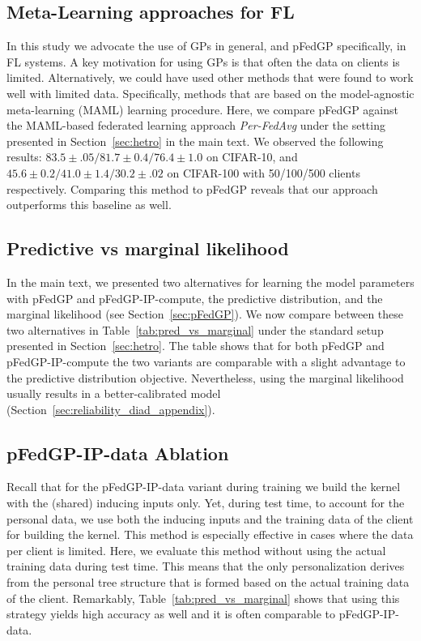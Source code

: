 \documentclass{article}
\def\Secref#1{Section~\ref{#1}}
\newcommand{\tblref}[1]{Table~\ref{#1}}
\begin{document}
\subsection{Meta-Learning approaches for FL}
In this study we advocate the use of GPs in general, and pFedGP specifically, in FL systems. A key motivation for using GPs is that often the data on clients is limited. Alternatively, we could have used other methods that were found to work well with limited data. Specifically, methods that are based on the model-agnostic meta-learning (MAML) \cite{li2017meta} learning procedure. Here, we compare pFedGP against the MAML-based federated learning approach \textit{Per-FedAvg} \cite{Fallah2020PersonalizedFL} under the setting presented in \Secref{sec:hetro} in the main text. We observed the following results: $83.5 \pm .05 / 81.7 \pm 0.4 / 76.4 \pm 1.0$ on CIFAR-10, and $45.6 \pm 0.2 / 41.0 \pm 1.4 / 30.2 \pm .02$ on CIFAR-100 with 50/100/500 clients respectively. Comparing this method to pFedGP reveals that our approach outperforms this baseline as well.


\subsection{Predictive vs marginal likelihood}
In the main text, we presented two alternatives for learning the model parameters with pFedGP and pFedGP-IP-compute, the predictive distribution, and the marginal likelihood (see \Secref{sec:pFedGP}). We now compare between these two alternatives in \tblref{tab:pred_vs_marginal} under the standard setup presented in \Secref{sec:hetro}. The table shows that for both pFedGP and pFedGP-IP-compute the two variants are comparable with a slight advantage to the predictive distribution objective. Nevertheless, using the marginal likelihood usually results in a better-calibrated model (\Secref{sec:reliability_diad_appendix}).

\subsection{pFedGP-IP-data Ablation} \label{sec_app:pFedGP_data_wo_pers}
Recall that for the pFedGP-IP-data variant during training we build the kernel with the (shared) inducing inputs only. Yet, during test time, to account for the personal data, we use both the inducing inputs and the training data of the client for building the kernel. This method is especially effective in cases where the data per client is limited. Here, we evaluate this method without using the actual training data during test time. This means that the only personalization derives from the personal tree structure that is formed based on the actual training data of the client. Remarkably, \tblref{tab:pred_vs_marginal} shows that using this strategy yields high accuracy as well and it is often comparable to pFedGP-IP-data.
\end{document}
